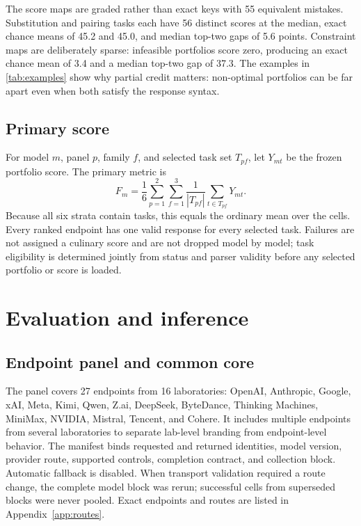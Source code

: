 \documentclass{article}
\begin{document}
The score maps are graded rather than exact keys with 55 equivalent mistakes. Substitution and
pairing tasks each have 56 distinct scores at the median, exact chance means of 45.2 and 45.0, and
median top-two gaps of 5.6 points. Constraint maps are deliberately sparse: infeasible portfolios
score zero, producing an exact chance mean of 3.4 and a median top-two gap of 37.3. The examples in
\cref{tab:examples} show why partial credit matters: non-optimal portfolios can be far apart even
when both satisfy the response syntax.

\begin{table}[t]
  \caption{Deterministically selected common-core examples. Parentheses give the frozen task score;
  the supplement includes complete prompts, choices, score maps, and raw responses.}
  \label{tab:examples}
  \centering
  \scriptsize
  
\end{table}

\subsection{Primary score}

For model $m$, panel $p$, family $f$, and selected task set $T_{pf}$, let $Y_{mt}$ be the frozen
portfolio score. The primary metric is
\begin{equation}
 F_m=\frac{1}{6}\sum_{p=1}^{2}\sum_{f=1}^{3}
      \frac{1}{|T_{pf}|}\sum_{t\in T_{pf}}Y_{mt}.
 \label{eq:fb-score}
\end{equation}
Because all six strata contain \FBTasksPerPanelFamily{} tasks, this equals the ordinary mean over
the \FBTasks{} cells. Every ranked endpoint has one valid response for every selected task. Failures
are not assigned a culinary score and are not dropped model by model; task eligibility is determined
jointly from status and parser validity before any selected portfolio or score is loaded.

\section{Evaluation and inference}
\label{sec:design}

\subsection{Endpoint panel and common core}

The panel covers 27 endpoints from 16 laboratories: OpenAI, Anthropic, Google, xAI, Meta, Kimi,
Qwen, Z.ai, DeepSeek, ByteDance, Thinking Machines, MiniMax, NVIDIA, Mistral, Tencent, and Cohere.
It includes multiple endpoints from several laboratories to separate lab-level branding from
endpoint-level behavior. The manifest binds requested and returned identities, model version,
provider route, supported controls, completion contract, and collection block. Automatic fallback
is disabled. When transport validation required a route change, the complete model block was rerun;
successful cells from superseded blocks were never pooled. Exact endpoints and routes are listed in
Appendix~\ref{app:routes}.
\end{document}
